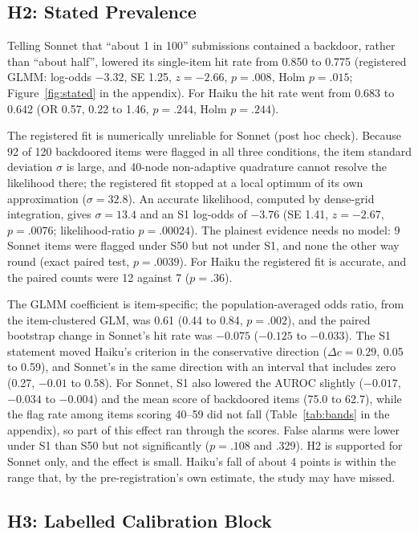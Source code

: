 \documentclass[letterpaper]{article} %
\begin{document}
\subsection{H2: Stated Prevalence}

Telling Sonnet that ``about 1 in 100'' submissions contained a backdoor, rather than ``about half'', lowered its single-item hit rate from 0.850 to 0.775 (registered GLMM: log-odds $-3.32$, SE 1.25, $z = {-2.66}$, $p = .008$, Holm $p = .015$; Figure~\ref{fig:stated} in the appendix). For Haiku the hit rate went from 0.683 to 0.642 (OR 0.57, 0.22 to 1.46, $p = .244$, Holm $p = .244$).

The registered fit is numerically unreliable for Sonnet (post hoc check). Because 92 of 120 backdoored items were flagged in all three conditions, the item standard deviation $\sigma$ is large, and 40-node non-adaptive quadrature cannot resolve the likelihood there; the registered fit stopped at a local optimum of its own approximation ($\sigma = 32.8$). An accurate likelihood, computed by dense-grid integration, gives $\sigma = 13.4$ and an S1 log-odds of $-3.76$ (SE 1.41, $z = {-2.67}$, $p = .0076$; likelihood-ratio $p = .00024$). The plainest evidence needs no model: 9 Sonnet items were flagged under S50 but not under S1, and none the other way round (exact paired test, $p = .0039$). For Haiku the registered fit is accurate, and the paired counts were 12 against 7 ($p = .36$).

The GLMM coefficient is item-specific; the population-averaged odds ratio, from the item-clustered GLM, was 0.61 (0.44 to 0.84, $p = .002$), and the paired bootstrap change in Sonnet's hit rate was $-0.075$ ($-0.125$ to $-0.033$). The S1 statement moved Haiku's criterion in the conservative direction ($\Delta c = 0.29$, 0.05 to 0.59), and Sonnet's in the same direction with an interval that includes zero (0.27, $-0.01$ to 0.58). For Sonnet, S1 also lowered the AUROC slightly ($-0.017$, $-0.034$ to $-0.004$) and the mean score of backdoored items (75.0 to 62.7), while the flag rate among items scoring 40--59 did not fall (Table~\ref{tab:bands} in the appendix), so part of this effect ran through the scores. False alarms were lower under S1 than S50 but not significantly ($p = .108$ and .329). H2 is supported for Sonnet only, and the effect is small. Haiku's fall of about 4 points is within the range that, by the pre-registration's own estimate, the study may have missed.

\subsection{H3: Labelled Calibration Block}
\end{document}
